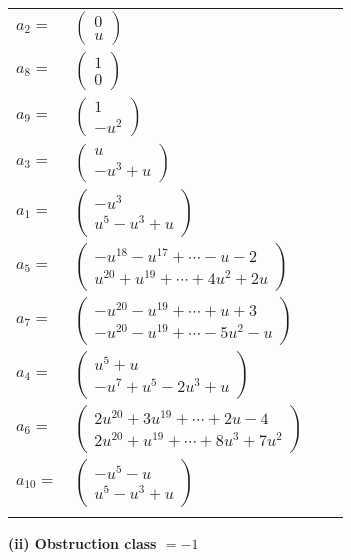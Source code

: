 \documentclass[1p]{elsarticle_modified}
\theoremstyle{definition}
\begin{document}
\begin{tabular}{m{7pt} m{180pt} m{7pt} m{180pt} }
\flushright $a_{2}=$&$\begin{pmatrix}0\\u\end{pmatrix}$ \\
\flushright $a_{8}=$&$\begin{pmatrix}1\\0\end{pmatrix}$ \\
\flushright $a_{9}=$&$\begin{pmatrix}1\\- u^2\end{pmatrix}$ \\
\flushright $a_{3}=$&$\begin{pmatrix}u\\- u^3+u\end{pmatrix}$ \\
\flushright $a_{1}=$&$\begin{pmatrix}- u^3\\u^5- u^3+u\end{pmatrix}$ \\
\flushright $a_{5}=$&$\begin{pmatrix}- u^{18}- u^{17}+\cdots- u-2\\u^{20}+u^{19}+\cdots+4 u^2+2 u\end{pmatrix}$ \\
\flushright $a_{7}=$&$\begin{pmatrix}- u^{20}- u^{19}+\cdots+u+3\\- u^{20}- u^{19}+\cdots-5 u^2- u\end{pmatrix}$ \\
\flushright $a_{4}=$&$\begin{pmatrix}u^5+u\\- u^7+u^5-2 u^3+u\end{pmatrix}$ \\
\flushright $a_{6}=$&$\begin{pmatrix}2 u^{20}+3 u^{19}+\cdots+2 u-4\\2 u^{20}+u^{19}+\cdots+8 u^3+7 u^2\end{pmatrix}$ \\
\flushright $a_{10}=$&$\begin{pmatrix}- u^5- u\\u^5- u^3+u\end{pmatrix}$\\&\end{tabular}
\flushleft \textbf{(ii) Obstruction class $= -1$}\\~\\
\end{document}
